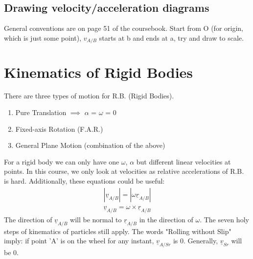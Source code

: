 \documentclass[a4paper, 12pt]{article}
\begin{document}
\subsection*{Drawing velocity/acceleration diagrams}
General conventions are on page 51 of the coursebook. Start from O (for origin, which is just some point),
$v_{A/B}$ starts at b and ends at a, try and draw to scale. 

\section*{Kinematics of Rigid Bodies}
There are three types of motion for R.B. (Rigid  Bodies). 
\begin{enumerate}
  \item Pure Translation $\implies$ $\alpha$ = $\omega$ = 0 
  \item Fixed-axis Rotation (F.A.R.) 
  \item General Plane Motion (combination of the above) 
\end{enumerate}

For a rigid body we can only have one $\omega$, $\alpha$ but different linear velocities at points. In this course, 
we only look at velocities as relative accelerations of R.B. is hard. Additionally, these equations could be useful:
\begin{align}
  |\underline{v}_{A/B}| = |\omega\underline{r}_{A/B}| \\
  \underline{v}_{A/B} = \omega\times\underline{r}_{A/B}
\end{align}
The direction of $\underline{v}_{A/B}$ will be normal to  $\underline{r}_{A/B}$ in the direction of $\omega$.
The seven holy steps of kinematics of particles still apply.
The words "Rolling without Slip" imply: if point 'A' is on the wheel for any instant, $\underline{v}_{A/Sr}$ is 0.
Generally, $\underline{v}_{Sr}$ will be 0.
\end{document}
